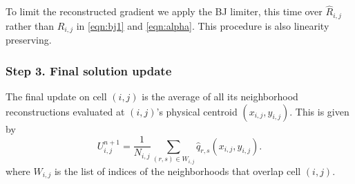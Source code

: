 
To limit the reconstructed gradient we apply the BJ limiter, this time over $\widehat{R}_{i,j}$
rather than $R_{i,j}$ in \eqref{eqn:bj1} and \eqref{eqn:alpha}.  This procedure is also 
linearity preserving. 


\subsubsection*{Step 3. Final solution update} 

The final update on cell $(i,j)$ is the average of all its neighborhood reconstructions 
evaluated at $(i,j)$'s physical centroid $(x_{i,j},y_{i,j})$. 
This is given by 
\begin{equation} \label{eqn:final_update_linear}
U^{n+1}_{i,j} =   \frac{1}{N_{i,j}}\sum_{(r,s)  \in W_{i,j}}\hat{q}_{r,s}(x_{i,j},y_{i,j}).
\end{equation}
where $W_{i,j}$ is the list of indices of the neighborhoods that overlap cell $(i,j)$.

\vspace*{.5in}


